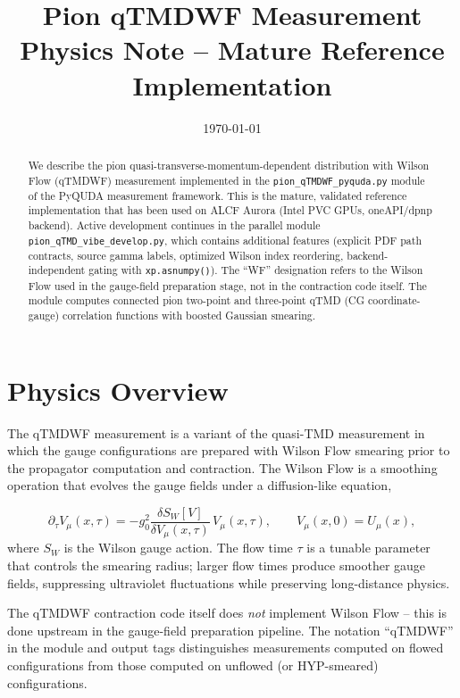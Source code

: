 \documentclass[11pt]{article}
\title{\textbf{Pion qTMDWF Measurement}\\[4pt]
\large Physics Note -- Mature Reference Implementation}
\author{}
\date{\today}
\begin{document}
\maketitle

\begin{abstract}
We describe the pion quasi-transverse-momentum-dependent distribution with Wilson Flow (qTMDWF) measurement implemented in the \texttt{pion\_qTMDWF\_pyquda.py} module of the PyQUDA measurement framework. This is the mature, validated reference implementation that has been used on ALCF Aurora (Intel PVC GPUs, oneAPI/dpnp backend). Active development continues in the parallel module \texttt{pion\_qTMD\_vibe\_develop.py}, which contains additional features (explicit PDF path contracts, source gamma labels, optimized Wilson index reordering, backend-independent gating with \texttt{xp.asnumpy()}). The ``WF'' designation refers to the Wilson Flow used in the gauge-field preparation stage, not in the contraction code itself. The module computes connected pion two-point and three-point qTMD (CG coordinate-gauge) correlation functions with boosted Gaussian smearing.
\end{abstract}

\tableofcontents

\section{Physics Overview}

The qTMDWF measurement is a variant of the quasi-TMD measurement in which the gauge configurations are prepared with Wilson Flow smearing prior to the propagator computation and contraction. The Wilson Flow is a smoothing operation that evolves the gauge fields under a diffusion-like equation,

\begin{equation}
    \partial_\tau V_\mu(x, \tau) = -g_0^2 \frac{\delta S_W[V]}{\delta V_\mu(x, \tau)}\, V_\mu(x, \tau),
    \qquad V_\mu(x, 0) = U_\mu(x),
\end{equation}
where $S_W$ is the Wilson gauge action. The flow time $\tau$ is a tunable parameter that controls the smearing radius; larger flow times produce smoother gauge fields, suppressing ultraviolet fluctuations while preserving long-distance physics.

The qTMDWF contraction code itself does \emph{not} implement Wilson Flow -- this is done upstream in the gauge-field preparation pipeline. The notation ``qTMDWF'' in the module and output tags distinguishes measurements computed on flowed configurations from those computed on unflowed (or HYP-smeared) configurations.
\end{document}
